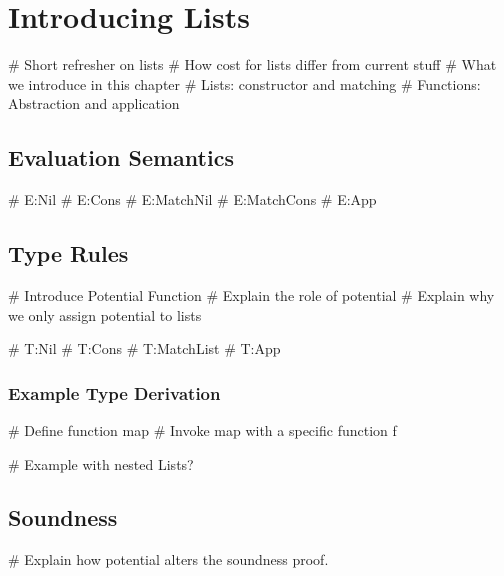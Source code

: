 \chapter{Introducing Lists}
# Short refresher on lists
# How cost for lists differ from current stuff
# What we introduce in this chapter
   # Lists: constructor and matching
   # Functions: Abstraction and application

\section{Evaluation Semantics}
# E:Nil
# E:Cons 
# E:MatchNil
# E:MatchCons
# E:App

\section{Type Rules}
# Introduce Potential Function
   # Explain the role of potential
   # Explain why we only assign potential to lists

# T:Nil
# T:Cons
# T:MatchList
# T:App

\subsection{Example Type Derivation}
# Define function map
# Invoke map with a specific function f

# Example with nested Lists?

\section{Soundness}

# Explain how potential alters the soundness proof.
